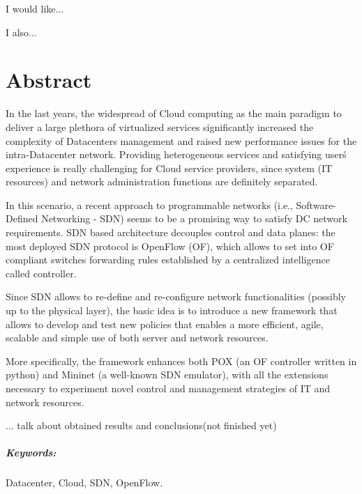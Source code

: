 \documentclass[12pt,english]{book}
\begin{document}

\noindent I would like...

\medskip{}
\noindent I also...

\chapter*{Abstract}


\begin{singlespace}
In the last years, the widespread of Cloud computing as the main paradigm to deliver a large plethora of virtualized services significantly increased the complexity of Datacenters management and raised new performance issues for the intra-Datacenter network.
Providing heterogeneous services and satisfying user\'s experience is really challenging for Cloud service providers, since system (IT resources) and network administration functions are definitely separated.

In this scenario, a recent approach to programmable networks (i.e., Software-Defined Networking - SDN) seems to be a promising way to satisfy DC network requirements\cite{ibmnec}.
SDN based architecture decouples control and data planes: the most deployed SDN protocol is OpenFlow (OF)\cite{onf}\cite{openflow}, which allows to set into OF compliant switches forwarding rules established by a centralized intelligence called controller. 

Since SDN allows to re-define and re-configure network functionalities (possibly up to the physical layer), the basic idea is to introduce a new framework that allows to develop and test new policies that enables a more efficient, agile, scalable and simple use of both server and network resources.

More specifically, the framework enhances both POX (an OF controller written in python) and Mininet (a well-known SDN emulator), with all the extensions necessary to experiment novel control and management strategies of IT and network resources.

... talk about obtained results and conclusions(not finished yet)

\end{singlespace}

\paragraph{Keywords:}
Datacenter, Cloud, SDN, OpenFlow.
\end{document}
